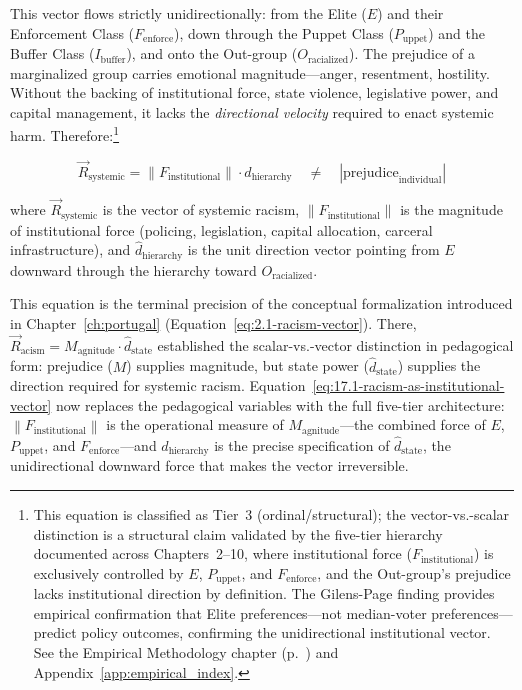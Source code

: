 This vector flows strictly unidirectionally: from the Elite ($E$) and their Enforcement Class ($F_{\text{enforce}}$), down through the Puppet Class ($P_{\text{uppet}}$) and the Buffer Class ($I_{\text{buffer}}$), and onto the Out-group ($O_{\text{racialized}}$). The prejudice of a marginalized group carries emotional magnitude---anger, resentment, hostility. Without the backing of institutional force, state violence, legislative power, and capital management, it lacks the \textit{directional velocity} required to enact systemic harm. Therefore:\footnote{This equation is classified as Tier~3 (ordinal/structural); the vector-vs.-scalar distinction is a structural claim validated by the five-tier hierarchy documented across Chapters~2--10, where institutional force ($F_{\text{institutional}}$) is exclusively controlled by $E$, $P_{\text{uppet}}$, and $F_{\text{enforce}}$, and the Out-group's prejudice lacks institutional direction by definition. The Gilens-Page finding \cite{gilens} provides empirical confirmation that Elite preferences---not median-voter preferences---predict policy outcomes, confirming the unidirectional institutional vector. See the Empirical Methodology chapter (p.~\pageref{ch:empirical_methodology}) and Appendix~\ref{app:empirical_index}.}

\begin{equation}\label{eq:17.1-racism-as-institutional-vector}
\vec{R}_{\text{systemic}} = \left\| F_{\text{institutional}} \right\| \cdot \hat{d}_{\text{hierarchy}} \quad \neq \quad \left| \text{prejudice}_{\text{individual}} \right|
\end{equation}

\noindent where $\vec{R}_{\text{systemic}}$ is the vector of systemic racism, $\left\| F_{\text{institutional}} \right\|$ is the magnitude of institutional force (policing, legislation, capital allocation, carceral infrastructure), and $\hat{d}_{\text{hierarchy}}$ is the unit direction vector pointing from $E$ downward through the hierarchy toward $O_{\text{racialized}}$.

This equation is the terminal precision of the conceptual formalization introduced in Chapter~\ref{ch:portugal} (Equation~\ref{eq:2.1-racism-vector}). There, $\vec{R}_{\text{acism}} = M_{\text{agnitude}} \cdot \hat{d}_{\text{state}}$ established the scalar-vs.-vector distinction in pedagogical form: prejudice ($M$) supplies magnitude, but state power ($\hat{d}_{\text{state}}$) supplies the direction required for systemic racism. Equation~\ref{eq:17.1-racism-as-institutional-vector} now replaces the pedagogical variables with the full five-tier architecture: $\left\| F_{\text{institutional}} \right\|$ is the operational measure of $M_{\text{agnitude}}$---the combined force of $E$, $P_{\text{uppet}}$, and $F_{\text{enforce}}$---and $\hat{d}_{\text{hierarchy}}$ is the precise specification of $\hat{d}_{\text{state}}$, the unidirectional downward force that makes the vector irreversible.

